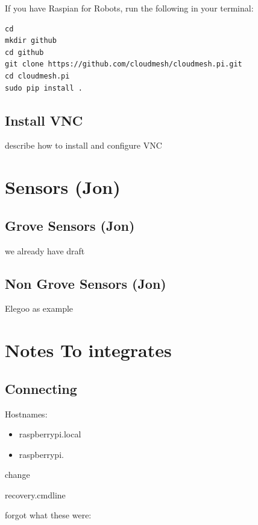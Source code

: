 If you have Raspian for Robots, run the following in your terminal:

\begin{verbatim}
cd
mkdir github
cd github
git clone https://github.com/cloudmesh/cloudmesh.pi.git
cd cloudmesh.pi
sudo pip install .
\end{verbatim}

\subsection{Install VNC}\label{install-vnc}

describe how to install and configure VNC

\section{Sensors (Jon)}\label{sensors-jon}

\subsection{Grove Sensors (Jon)}\label{grove-sensors-jon}

we already have draft

\subsection{Non Grove Sensors (Jon)}\label{non-grove-sensors-jon}

Elegoo as example

\section{Notes To integrates}\label{notes-to-integrates}

\subsection{Connecting}\label{connecting}

Hostnames:

\begin{itemize}

\item
  raspberrypi.local
\item
  raspberrypi.
\end{itemize}

change

recovery.cmdline

forgot what these were:

